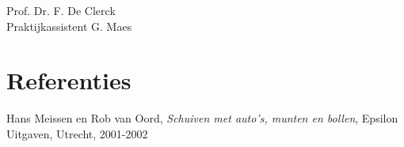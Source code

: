 \documentclass[12pt]{article}
\numberwithin{equation}{section} %
\theoremstyle{plain}  \newtheorem{stel}{Stelling}[section]
\theoremstyle{plain}  \newtheorem{lemma}[stel]{Lemma}
\theoremstyle{plain}  \newtheorem{gevolg}[stel]{Gevolg}
\theoremstyle{definition}  \newtheorem{defi}[stel]{Definitie}
\theoremstyle{definition} \newtheorem{vb}[stel]{Voorbeeld}
\theoremstyle{definition} \newtheorem{vbn}[stel]{Voorbeelden}
\theoremstyle{definition}  \newtheorem{opm}[stel]{Opmerking}
\theoremstyle{plain}  \newtheorem{opdracht}{Opdracht}
\begin{document}
\bigskip

\hspace*{\fill}
\begin{minipage}{8cm}
\noindent  Prof. Dr.  F. De Clerck\\
Praktijkassistent G. Maes
 \end{minipage}

\newpage
\tableofcontents 
\newpage



\newpage

\newpage

\newpage

\newpage

\section{Referenties}
\begin{thebibliography}{1}
\label{1} Hans Meissen en Rob van Oord, \textit{Schuiven met auto's, munten en bollen}, Epsilon Uitgaven, Utrecht, 2001-2002\\
\end{thebibliography}
\end{document}
